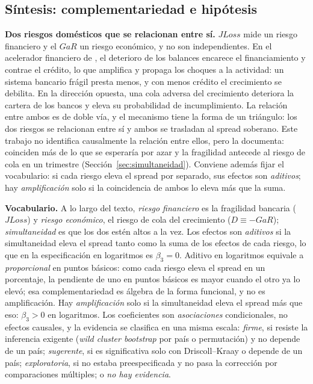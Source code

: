 \subsection{Síntesis: complementariedad e hipótesis}
\label{sec:sintesis-pilares}

\textbf{Dos riesgos domésticos que se relacionan entre sí.} $JLoss$ mide un riesgo financiero y el $GaR$ un riesgo económico, y no son independientes. En el acelerador financiero de \citet{BernankeGertlerGilchrist1996}, el deterioro de los balances encarece el financiamiento y contrae el crédito, lo que amplifica y propaga los choques a la actividad: un sistema bancario frágil presta menos, y con menos crédito el crecimiento se debilita. En la dirección opuesta, una cola adversa del crecimiento deteriora la cartera de los bancos y eleva su probabilidad de incumplimiento. La relación entre ambos es de doble vía, y el mecanismo tiene la forma de un triángulo: los dos riesgos se relacionan entre sí y ambos se trasladan al spread soberano. Este trabajo no identifica causalmente la relación entre ellos, pero la documenta: coinciden más de lo que se esperaría por azar y la fragilidad antecede al riesgo de cola en un trimestre (Sección~\ref{sec:simultaneidad}). Conviene además fijar el vocabulario: si cada riesgo eleva el spread por separado, sus efectos son \emph{aditivos}; hay \emph{amplificación} solo si la coincidencia de ambos lo eleva más que la suma.

\textbf{Vocabulario.} A lo largo del texto, \emph{riesgo financiero} es la fragilidad bancaria ($JLoss$) y \emph{riesgo económico}, el riesgo de cola del crecimiento ($D\equiv-GaR$); \emph{simultaneidad} es que los dos estén altos a la vez. Los efectos son \emph{aditivos} si la simultaneidad eleva el spread tanto como la suma de los efectos de cada riesgo, lo que en la especificación en logaritmos es $\beta_3=0$. Aditivo en logaritmos equivale a \emph{proporcional} en puntos básicos: como cada riesgo eleva el spread en un porcentaje, la pendiente de uno en puntos básicos es mayor cuando el otro ya lo elevó; esa complementariedad es álgebra de la forma funcional, y no es amplificación. Hay \emph{amplificación} solo si la simultaneidad eleva el spread más que eso: $\beta_3>0$ en logaritmos. Los coeficientes son \emph{asociaciones} condicionales, no efectos causales, y la evidencia se clasifica en una misma escala: \emph{firme}, si resiste la inferencia exigente (\textit{wild cluster bootstrap} por país o permutación) y no depende de un país; \emph{sugerente}, si es significativa solo con Driscoll--Kraay o depende de un país; \emph{exploratoria}, si no estaba preespecificada y no pasa la corrección por comparaciones múltiples; o \emph{no hay evidencia}.

